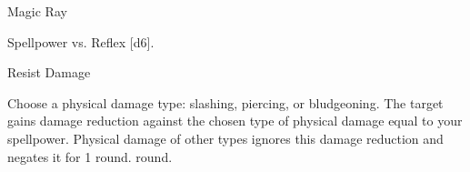 \begin{spellsection}{Magic Ray}
    \begin{spellheader}
    \end{spellheader}
    \begin{spellcontent}
        \begin{spelltargetinginfo}
        \end{spelltargetinginfo}
        \begin{spelleffects}
            \begin{spellattack}{Spellpower vs. Reflex}
                \spellsuccess {}[d6].
            \end{spellattack}
        \end{spelleffects}
    \end{spellcontent}
    \begin{spellfooter}
        \spellnotes \forcespellnotes
    \end{spellfooter}
\end{spellsection}

\begin{spellsection}{Resist Damage}
    \begin{spellheader}
    \end{spellheader}
    \begin{spellcontent}
        \begin{spelltargetinginfo}
        \end{spelltargetinginfo}
        \begin{spelleffects}
            \spellspecial Choose a physical damage type: slashing, piercing, or bludgeoning.
            \spelleffect The target gains damage reduction against the chosen type of physical damage equal to your spellpower. Physical damage of other types ignores this damage reduction and negates it for 1 round.
             round.
        \end{spelleffects}
    \end{spellcontent}
    \begin{spellfooter}
    \end{spellfooter}
\end{spellsection}

